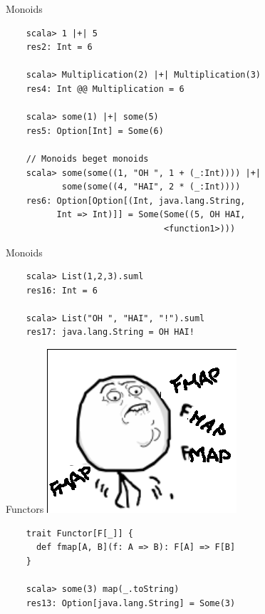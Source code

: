\documentclass{beamer}
\begin{document}
\begin{frame}[fragile]{Monoids}
  \begin{verbatim}
    scala> 1 |+| 5
    res2: Int = 6

    scala> Multiplication(2) |+| Multiplication(3)
    res4: Int @@ Multiplication = 6

    scala> some(1) |+| some(5)
    res5: Option[Int] = Some(6)

    // Monoids beget monoids
    scala> some(some((1, "OH ", 1 + (_:Int)))) |+|
           some(some((4, "HAI", 2 * (_:Int))))
    res6: Option[Option[(Int, java.lang.String,
          Int => Int)]] = Some(Some((5, OH HAI,
                               <function1>)))
  \end{verbatim}
\end{frame}

\begin{frame}[fragile]{Monoids}
  \begin{verbatim}
    scala> List(1,2,3).suml
    res16: Int = 6

    scala> List("OH ", "HAI", "!").suml
    res17: java.lang.String = OH HAI!
  \end{verbatim}
\end{frame}


\begin{frame}[fragile]{Functors}
  \includegraphics[scale=0.5]{fmapfmapfmap}
  \begin{verbatim}
    trait Functor[F[_]] {
      def fmap[A, B](f: A => B): F[A] => F[B]
    }

    scala> some(3) map(_.toString)
    res13: Option[java.lang.String] = Some(3)
  \end{verbatim}
\end{frame}
\end{document}
